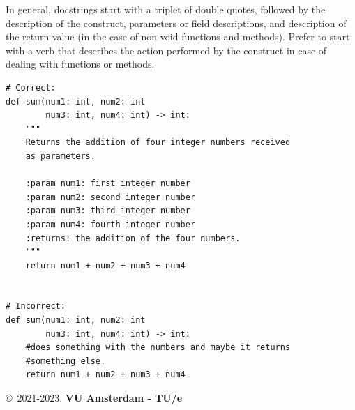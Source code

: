 \documentclass{tufte-handout}
\begin{document}
In general, docstrings start with a triplet of double quotes, followed by the description of the construct, parameters or field descriptions, and description of the return value (in the case of non-void functions and methods).
Prefer to start with a verb that describes the action performed by the construct in case of dealing with functions or methods.

\begin{mdframed}
\begin{verbatim}
# Correct:
def sum(num1: int, num2: int
        num3: int, num4: int) -> int:
    """
    Returns the addition of four integer numbers received 
    as parameters.
    
    :param num1: first integer number
    :param num2: second integer number
    :param num3: third integer number
    :param num4: fourth integer number
    :returns: the addition of the four numbers.
    """
    return num1 + num2 + num3 + num4
    
    
# Incorrect:
def sum(num1: int, num2: int
        num3: int, num4: int) -> int:
    #does something with the numbers and maybe it returns 
    #something else.
    return num1 + num2 + num3 + num4
\end{verbatim}
\end{mdframed}



%



\copyright~2021-2023. \textbf{VU Amsterdam - TU/e}
\end{document}
